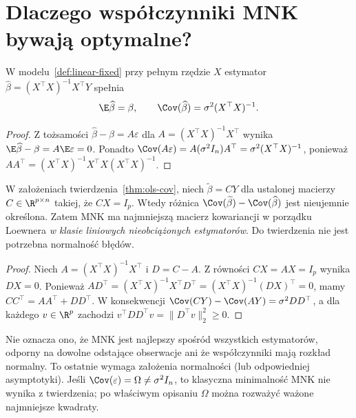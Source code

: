 \section{Dlaczego współczynniki MNK bywają optymalne?}
\begin{twierdzenie}
\label{thm:ols-cov}
W modelu~\ref{def:linear-fixed} przy pełnym rzędzie $X$
estymator $\widehat\beta=(X^\top X)^{-1}X^\top Y$
spełnia
\[
 \E\widehat\beta=\beta,\qquad
 \Cov(\widehat\beta)=\sigma^2(X^\top X)^{-1}.
\]
\end{twierdzenie}
\begin{proof}
Z tożsamości $\widehat\beta-\beta=A\varepsilon$ dla
$A=(X^\top X)^{-1}X^\top$ wynika
$\E\widehat\beta-\beta=A\E\varepsilon=0$.
Ponadto $\Cov(A\varepsilon)=A(\sigma^2I_n)A^\top
=\sigma^2(X^\top X)^{-1}$, ponieważ
$AA^\top=(X^\top X)^{-1}X^\top X(X^\top X)^{-1}$.
\end{proof}

\begin{twierdzenie}
\label{thm:gauss-markov}
W założeniach twierdzenia~\ref{thm:ols-cov}, niech
$\widetilde\beta=CY$ dla ustalonej macierzy
$C\in\R^{p\times n}$ takiej, że $CX=I_p$.
Wtedy różnica
$\Cov(\widetilde\beta)-\Cov(\widehat\beta)$
jest nieujemnie określona. Zatem MNK ma najmniejszą
macierz kowariancji w porządku Loewnera \emph{w klasie
liniowych nieobciążonych estymatorów}.
Do twierdzenia nie jest potrzebna normalność błędów.
\end{twierdzenie}
\begin{proof}
Niech $A=(X^\top X)^{-1}X^\top$ i $D=C-A$.
Z równości $CX=AX=I_p$ wynika $DX=0$.
Ponieważ $AD^\top=(X^\top X)^{-1}X^\top D^\top
=(X^\top X)^{-1}(DX)^\top=0$, mamy
$CC^\top=AA^\top+DD^\top$.
W konsekwencji
$\Cov(CY)-\Cov(AY)=\sigma^2DD^\top$,
a dla każdego $v\in\R^p$ zachodzi
$v^\top DD^\top v=\|D^\top v\|_2^2\ge0$.
\end{proof}

\begin{uwaga}
Nie oznacza ono, że MNK jest najlepszy spośród wszystkich
estymatorów, odporny na dowolne odstające obserwacje ani że
współczynniki mają rozkład normalny. To ostatnie wymaga
założenia normalności (lub odpowiedniej asymptotyki).
Jeśli $\Cov(\varepsilon)=\Omega\ne\sigma^2I_n$,
to klasyczna minimalność MNK nie wynika z twierdzenia;
po właściwym opisaniu $\Omega$ można rozważyć ważone
najmniejsze kwadraty.
\end{uwaga}

